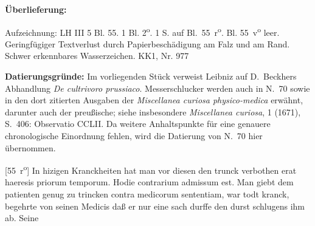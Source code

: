 \begin{ledgroupsized}[r]{120mm}%
\footnotesize%
\pstart%
\noindent\textbf{\"{U}berlieferung:}%
\pend%
\end{ledgroupsized}%
\begin{ledgroupsized}[r]{114mm}%
\footnotesize%
\pstart%
\parindent -6mm%
%
Aufzeichnung:
LH III 5 Bl. 55.
1 Bl. 2\textsuperscript{o}. 1 S. auf Bl.~55~r\textsuperscript{o}.
Bl. 55~v\textsuperscript{o} leer.
Geringf\"{u}giger Textverlust durch Papierbeschädigung am Falz und am Rand.
Schwer erkennbares Wasserzeichen.%
\newline%
KK1, Nr. 977%
\pend%
\end{ledgroupsized}%
%
\vspace*{5mm}%
\begin{ledgroup}%
\footnotesize%
\pstart%
\noindent%
\footnotesize{%
\textbf{Datierungsgr\"{u}nde:}
Im vorliegenden Stück verweist Leibniz auf \cite{00008}D.~Beckhers Abhandlung \textit{De cultrivoro prussiaco}.
Messerschlucker werden auch in N.~70 sowie in den dort zitierten Ausgaben der \textit{Miscellanea curiosa physico-medica}\cite{00001} erwähnt, darunter auch der preußische; siehe insbesondere \textit{Miscellanea curiosa}, 1 (1671), S.~406: Observatio CCLII.
Da weitere Anhaltspunkte für eine genauere chronologische Einordnung fehlen, wird die Datierung von N.~70 hier übernommen.
}%
\pend%
\end{ledgroup}%
%
%
\vspace*{8mm}%
\count{}
\count{}
\count{}
\pstart%
\normalsize%
\noindent%
[55~r\textsuperscript{o}] 
In hizigen Kranckheiten hat man vor diesen den trunck verbothen erat haeresis priorum temporum. Hodie contrarium admissum est. Man giebt dem patienten genug zu trincken contra medicorum sententiam,  war todt kranck, begehrte von seinen Medicis da{\ss} er nur eine sach durffe den durst  schlugens ihm ab. Seine 
